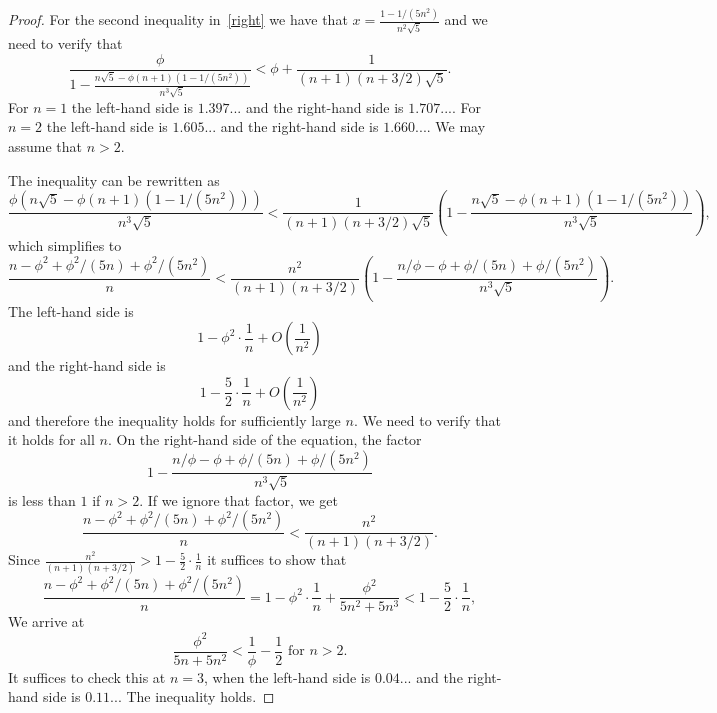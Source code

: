 \documentclass[12pt,reqno]{article}
\begin{document}
\begin{proof}
    For the
    second inequality in~\ref{right} we have that $x=\frac{1-1/(5n^2)}{n^2\sqrt 5}$ and we need to verify that 
    \[
    \frac{\phi}{1-\frac {n\sqrt 5 -\phi(n+1)(1-1/(5n^2))}{n^3\sqrt 5}}<\phi+\frac{1}{(n+1)(n+3/2)\sqrt 5}.
    \]
    For $n=1$ the left-hand side is $1.397...$ and the right-hand side is $1.707...$. For $n=2$ 
    the left-hand side is $1.605...$ and the right-hand side is $1.660...$. 
    We may assume that $n>2$.
    
    The inequality can be rewritten as
    \[
    \frac{\phi(n\sqrt 5 -\phi(n+1)(1-1/(5n^2)))}{n^3\sqrt 5}<\frac{1}{(n+1)(n+3/2)\sqrt 5}\left(1-\frac {n\sqrt 5 -\phi(n+1)(1-1/(5n^2))}{n^3\sqrt 5}\right),
    \]
    which simplifies to
    \[
    \frac{
    n-\phi^2+\phi^2/{(5n)}+\phi^2/(5n^2)}n<\frac{n^2}{(n+1)(n+3/2)}\left(1-\frac {n/\phi -\phi +\phi/(5n)+\phi/(5n^2)}{n^3\sqrt 5}\right).
    \]
    The left-hand side is \[1-\phi^2\cdot \frac{1}{n}+O\left(\frac 1{n^2}\right)\] and the right-hand side is \[1-\frac 52 \cdot \frac 1n+O\left(\frac 1 {n^2}\right)\] and therefore the inequality holds for sufficiently large $n$. We need to verify that it
    holds for all $n$. On the right-hand side of the equation, the factor 
    \[
    1-\frac {n/\phi -\phi +\phi/(5n)+\phi/(5n^2)}{n^3\sqrt 5}
    \]
    is less than $1$ if $n>2$. If we ignore that factor, we get
    \[
    \frac{
    n-\phi^2+\phi^2/{(5n)}+\phi^2/(5n^2)}n<\frac{n^2}{(n+1)(n+3/2)}.
    \]
Since $\frac{n^2}{(n+1)(n+3/2)}>1-\frac 52 \cdot\frac 1n$ it suffices to show that
    \[
    \frac{
    n-\phi^2+\phi^2/{(5n)}+\phi^2/(5n^2)}n=1-\phi^2\cdot\frac 1n +\frac{\phi^2}{5n^2+5n^3}<1-\frac 52 \cdot\frac 1n,
    \]
    We arrive at
    \[
    \frac{\phi^2}{5n+5n^2}<\frac 1\phi-\frac 12 \text{ for }n>2.
    \]
    It suffices to check this at $n=3$, when the left-hand side is $0.04...$ and the right-hand side is $0.11..$.
    The inequality holds.
\end{proof}
\end{document}

